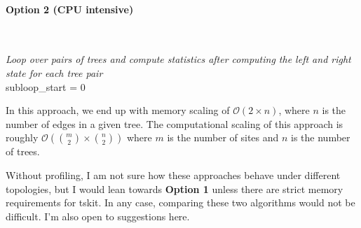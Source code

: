 \documentclass[12pt]{article}
\begin{document}
\paragraph{Option 2 (CPU intensive)}
\mbox{} \\
\begin{algorithm}[H]

  \emph{Loop over pairs of trees and compute statistics after computing the left
  and right state for each tree pair} \\
  subloop\_start = 0 \\
  
\end{algorithm}

In this approach, we end up with memory scaling of $\mathcal{O}(2 \times n)$,
where $n$ is the number of edges in a given tree. The computational scaling of
this approach is roughly $\mathcal{O}(\binom{m}{2} \times \binom{n}{2})$ where
$m$ is the number of sites and $n$ is the number of trees.

Without profiling, I am not sure how these approaches behave under different
topologies, but I would lean towards \textbf{Option 1} unless there are strict
memory requirements for tskit. In any case, comparing these two algorithms would
not be difficult. I'm also open to suggestions here.
\end{document}
